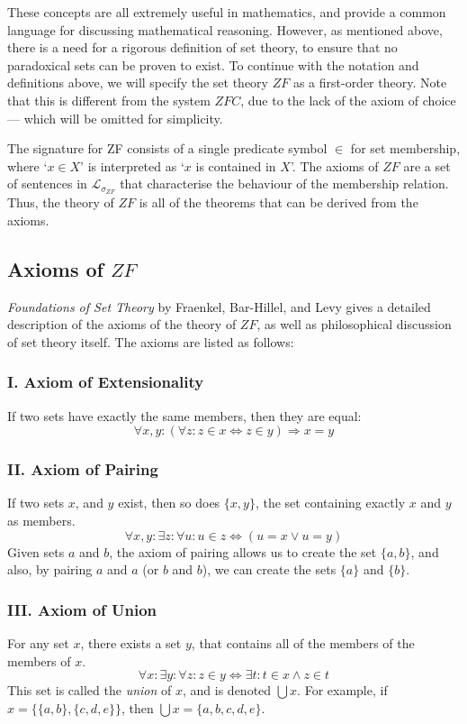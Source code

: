 \documentclass[11pt]{report}
\theoremstyle{definition}
\theoremstyle{theorem}
\theoremstyle{lemma}
\begin{document}
These concepts are all extremely useful in mathematics, and provide a common language for discussing mathematical reasoning. 
However, as mentioned above, there is a need for a rigorous definition of set theory, to ensure that no paradoxical sets can be proven to exist. 
To continue with the notation and definitions above, we will specify the set theory $\mathit{ZF}$ as a first-order theory.
Note that this is different from the system $\mathit{ZFC}$, due to the lack of the axiom of choice --- which will be omitted for simplicity.

The signature for ZF consists of a single predicate symbol $\in$ for set membership, where `$x \in X$' is interpreted as `$x$ is contained in $X$'.
The axioms of $\mathit{ZF}$ are a set of sentences in $\mathcal{L}_{\sigma_{\mathit{ZF}}}$ that characterise the behaviour of the membership relation.
Thus, the theory of $\mathit{ZF}$ is all of the theorems that can be derived from the axioms.

\subsection{Axioms of $\mathit{ZF}$}
\textit{Foundations of Set Theory} by Fraenkel, Bar-Hillel, and Levy \cite{foundations} gives a detailed description of the axioms of the theory of $\mathit{ZF}$, as well as philosophical discussion of set theory itself.
The axioms are listed as follows:

\subsubsection*{I. Axiom of Extensionality}
If two sets have exactly the same members, then they are equal:
$$\forall x,y:(\forall z: z\in x \Leftrightarrow z\in y) \Rightarrow x=y$$

\subsubsection*{II. Axiom of Pairing}
If two sets $x$, and $y$ exist, then so does $\{x,y\}$, the set containing exactly $x$ and $y$ as members.
$$\forall x,y: \exists z: \forall u: u\in z \Leftrightarrow (u=x \vee u=y)$$
Given sets $a$ and $b$, the axiom of pairing allows us to create the set $\{a,b\}$, and also, by pairing $a$ and $a$ (or $b$ and $b$), we can create the sets $\{a\}$ and $\{b\}$.

\subsubsection*{III. Axiom of Union}
For any set $x$, there exists a set $y$, that contains all of the members of the members of $x$.
$$\forall x: \exists y: \forall z: z\in y \Leftrightarrow \exists t: t\in x \wedge z\in t$$
This set is called the \emph{union} of $x$, and is denoted $\bigcup x$.
For example, if $x = \{\{a,b\}, \{c,d,e\}\}$, then $\bigcup x = \{a,b,c,d,e\}$.
\end{document}
